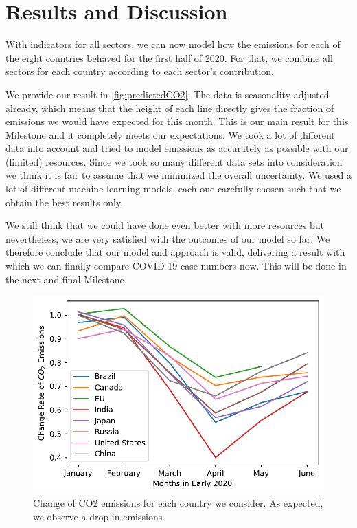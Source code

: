 \section{Results and Discussion}

%

With indicators for all sectors, we can now model how the \co emissions for each of the eight countries behaved for the first half of 2020. For that, we combine all sectors for each country according to each sector's contribution.


We provide our result in \autoref{fig:predictedCO2}. The data is seasonality adjusted already, which means that the height of each line directly gives the fraction of \co emissions we would have expected for this month. This is our main result for this Milestone and it completely meets our expectations. We took a lot of different data into account and tried to model \co emissions as accurately as possible with our (limited) resources. Since we took so many different data sets into consideration we think it is fair to assume that we minimized the overall uncertainty. We used a lot of different machine learning models, each one carefully chosen such that we obtain the best results only. 

We still think that we could have done even better with more resources but nevertheless, we are very satisfied with the outcomes of our model so far. We therefore conclude that our model and approach is valid, delivering a result with which we can finally compare COVID-19 case numbers now. This will be done in the next and final Milestone.

\begin{figure}[hb!]
	\centering
	\includegraphics[width=0.7\linewidth]{../predictions/change_rate.pdf}
	\caption{Change of CO2 emissions for each country we consider. As expected, we observe a drop in \co emissions.}
	\label{fig:predictedCO2}
\end{figure}



